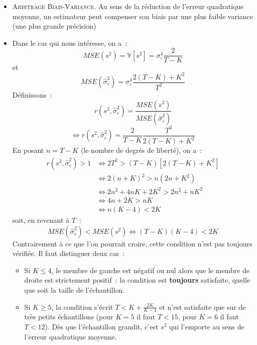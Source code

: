 \documentclass[10pt]{beamer}
\begin{document}
\begin{notes}
\begin{itemize}
  \item \textsc{Arbitrage Biais-Variance.} Au sens de la réduction de l'erreur quadratique moyenne, un estimateur peut compenser son biais par une plus faible variance (une plus grande précision)\newline

  \item Dans le cas qui nous intéresse, on a~:
    \[
      MSE(s^2) = \mathbb V\left[ s^2 \right] = \sigma_{\varepsilon}^4\frac{2}{T-K}
    \]
    et
    \[
      MSE(\hat{\sigma}_{\varepsilon}^2) = \sigma_{\varepsilon}^4 \frac{2(T-K)+K^2}{T^2}
    \]
    Définissons~:
    \[
      r(s^2, \hat{\sigma}_{\varepsilon}^2) = \frac{MSE(s^2)}{MSE(\hat{\sigma}_{\varepsilon}^2)}
    \]
    \[
      \Leftrightarrow r(s^2, \hat{\sigma}_{\varepsilon}^2) = \frac{2}{T-K}\frac{T^2}{2(T-K)+K^2}
    \]
    En posant $n = T-K$ (le nombre de degrés de liberté), on a~:
    \[
      \begin{split}
        r(s^2, \hat{\sigma}_{\varepsilon}^2) >1 &\Leftrightarrow 2T^2 > (T-K)\left[ 2(T-K) + K^2 \right]\\
                                                &\Leftrightarrow 2(n+K)^2 > n\left( 2n + K^2 \right)\\
                                                &\Leftrightarrow 2n^2 + 4nK + 2K^2 > 2n^2 + nK^2\\
                                                &\Leftrightarrow 4n + 2K > nK\\
                                                &\Leftrightarrow n(K-4) < 2K
      \end{split}
    \]
    soit, en revenant à $T$~:
    \[
      \boxed{MSE(\hat{\sigma}_{\varepsilon}^2) < MSE(s^2) \Leftrightarrow (T-K)(K-4)<2K}
    \]
    Contrairement à ce que l'on pourrait croire, cette condition n'est pas toujours vérifiée. Il faut distinguer deux cas~:
    \begin{itemize}
    \item Si $K\leq 4$, le membre de gauche est négatif ou nul alors que le membre de droite est strictement positif~: la condition est \textbf{toujours} satisfaite, quelle que soit la taille de l'échantillon.\newline
    \item Si $K\geq 5$, la condition s'écrit $T < K + \frac{2K}{K-4}$ et n'est satisfaite que sur de très petits échantillons (pour $K=5$ il faut $T<15$, pour $K=6$ il faut $T<12$). Dès que l'échantillon grandit, c'est $s^2$ qui l'emporte au sens de l'erreur quadratique moyenne.
    \end{itemize}


\end{itemize}
\end{notes}
\end{document}
